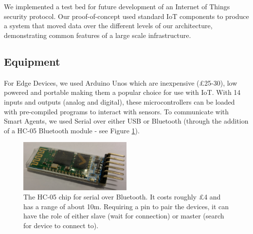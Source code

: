 
We implemented a test bed for future development of an Internet of Things security protocol. Our proof-of-concept used standard IoT components to produce a system that moved data over the different levels of our architecture, demonstrating common features of a large scale infrastructure.



\subsection{Equipment}
\paragraph{}
For Edge Devices, we used Arduino Unos which are inexpensive (£25-30), low powered and portable making them a popular choice for use with IoT. With 14 inputs and outputs (analog and digital), these microcontrollers can be loaded with pre-compiled programs to interact with sensors. To communicate with Smart Agents, we used Serial over either USB or Bluetooth (through the addition of a HC-05 Bluetooth module - see Figure \ref{fig:HC-05}).


\begin{figure}
    \centering
    \includegraphics[width=0.5\textwidth]{HC05.jpg}
    \caption{The HC-05 chip for serial over Bluetooth. It costs roughly £4 and has a range of about 10m. Requiring a pin to pair the devices, it can have the role of either slave (wait for connection) or master (search for device to connect to).}
    \label{fig:HC-05}
\end{figure}

